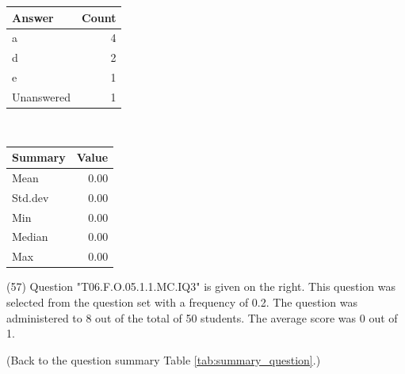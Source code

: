 \documentclass[12pt,english,nohyper]{tufte-handout}\usepackage[]{graphicx}\usepackage[]{color}
\begin{document}
\begin{center}%
\begin{tabular}{lr}
  \hline
Answer & Count \\ 
  \hline
a &   4 \\ 
  d &   2 \\ 
  e &   1 \\ 
  Unanswered &   1 \\ 
   \hline
\end{tabular}
~~~~~~~~%
\begin{tabular}{lr}
  \hline
Summary & Value \\ 
  \hline
Mean & 0.00 \\ 
  Std.dev & 0.00 \\ 
  Min & 0.00 \\ 
  Median & 0.00 \\ 
  Max & 0.00 \\ 
   \hline
\end{tabular}
\end{center}\newpage{} (57) Question "T06.F.O.05.1.1.MC.IQ3" is given on the right. This question was selected from the question set with a frequency of 0.2. The question was administered to 8 out of the total of 50 students. The average score was 0 out of 1.

 (Back to the question summary Table \ref{tab:summary_question}.)
\end{document}
